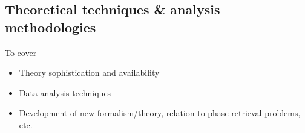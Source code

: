 \subsection{Theoretical techniques \& analysis methodologies}

To cover

\begin{itemize}
\item Theory sophistication and availability
\item Data analysis techniques
\item Development of new formalism/theory, relation to phase retrieval problems, etc.
\end{itemize}
